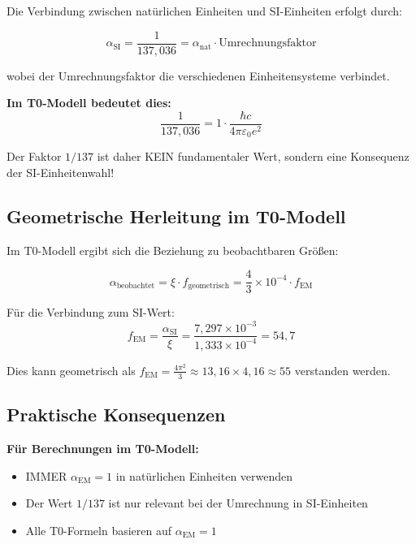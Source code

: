 \documentclass[12pt,a4paper]{report}
\begin{document}
	Die Verbindung zwischen natürlichen Einheiten und SI-Einheiten erfolgt durch:
	
	\begin{equation}
		\alpha_{\text{SI}} = \frac{1}{137,036} = \alpha_{\text{nat}} \cdot \text{Umrechnungsfaktor}
	\end{equation}
	
	wobei der Umrechnungsfaktor die verschiedenen Einheitensysteme verbindet.
	
	\textbf{Im T0-Modell bedeutet dies:}
	\begin{equation}
		\frac{1}{137,036} = 1 \cdot \frac{\hbar c}{4\pi\varepsilon_0 e^2}
	\end{equation}
	
	Der Faktor $1/137$ ist daher KEIN fundamentaler Wert, sondern eine Konsequenz der SI-Einheitenwahl!
	
	\subsection{Geometrische Herleitung im T0-Modell}
	\label{subsec:geometric_derivation_t0}
	
	Im T0-Modell ergibt sich die Beziehung zu beobachtbaren Größen:
	
	\begin{equation}
		\alpha_{\text{beobachtet}} = \xi \cdot f_{\text{geometrisch}} = \frac{4}{3} \times 10^{-4} \cdot f_{\text{EM}}
	\end{equation}
	
	Für die Verbindung zum SI-Wert:
	\begin{equation}
		f_{\text{EM}} = \frac{\alpha_{\text{SI}}}{\xi} = \frac{7,297 \times 10^{-3}}{1,333 \times 10^{-4}} = 54,7
	\end{equation}
	
	Dies kann geometrisch als $f_{\text{EM}} = \frac{4\pi^2}{3} \approx 13,16 \times 4,16 \approx 55$ verstanden werden.
	
	\subsection{Praktische Konsequenzen}
	\label{subsec:practical_consequences}
	
	\textbf{Für Berechnungen im T0-Modell:}
	\begin{itemize}
		\item IMMER $\alpha_{\text{EM}} = 1$ in natürlichen Einheiten verwenden
		\item Der Wert $1/137$ ist nur relevant bei der Umrechnung in SI-Einheiten
		\item Alle T0-Formeln basieren auf $\alpha_{\text{EM}} = 1$
	\end{itemize}
	
\end{document}
